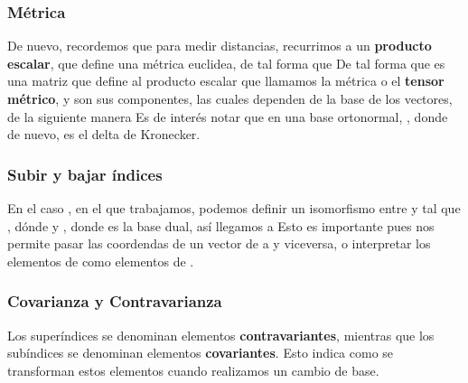 \subsubsection{Métrica}
De nuevo, recordemos que para medir distancias, recurrimos a un \textbf{producto escalar}, que define una métrica euclidea, de tal forma que
De tal forma que  es una matriz que define al producto escalar que llamamos la métrica o el \textbf{tensor métrico}, y  son sus componentes, las cuales dependen de la base de los vectores, de la siguiente manera
Es de interés notar que en una base ortonormal, , donde de nuevo,  es el delta de Kronecker.
\subsubsection{Subir y bajar índices}
En el caso \lrg{$\R$}, en el que trabajamos, podemos definir un isomorfismo entre  y  tal que , dónde  y , donde  es la base dual, así llegamos a
Esto es importante pues nos permite pasar las coordendas de un vector de  a  y viceversa, o interpretar los elementos de  como elementos de .
\subsubsection{Covarianza y Contravarianza}
Los superíndices se denominan elementos \textbf{contravariantes}, mientras que los subíndices se denominan elementos \textbf{covariantes}. Esto indica como se transforman estos elementos cuando realizamos un cambio de base.

